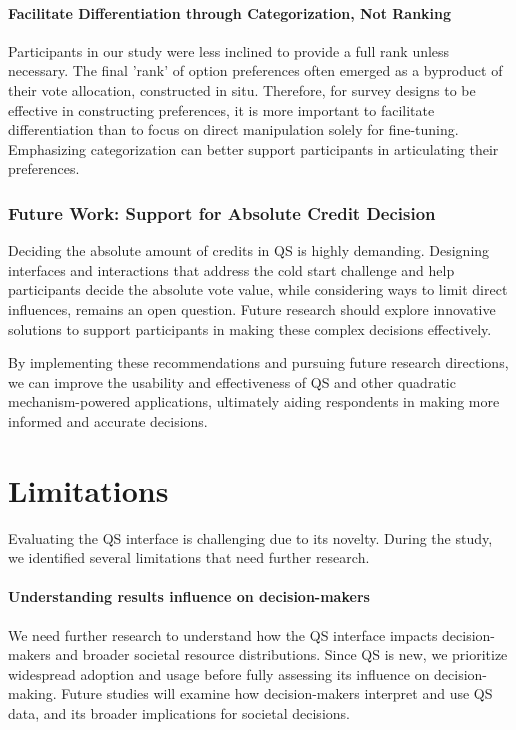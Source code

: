 \paragraph{Facilitate Differentiation through Categorization, Not Ranking}
Participants in our study were less inclined to provide a full rank unless necessary. The final 'rank' of option preferences often emerged as a byproduct of their vote allocation, constructed in situ. Therefore, for survey designs to be effective in constructing preferences, it is more important to facilitate differentiation than to focus on direct manipulation solely for fine-tuning. Emphasizing categorization can better support participants in articulating their preferences.

\subsubsection{Future Work: Support for Absolute Credit Decision}
Deciding the absolute amount of credits in QS is highly demanding. Designing interfaces and interactions that address the cold start challenge and help participants decide the absolute vote value, while considering ways to limit direct influences, remains an open question. Future research should explore innovative solutions to support participants in making these complex decisions effectively.

By implementing these recommendations and pursuing future research directions, we can improve the usability and effectiveness of QS and other quadratic mechanism-powered applications, ultimately aiding respondents in making more informed and accurate decisions.

\section{Limitations}
\label{sec:limitations}
Evaluating the QS interface is challenging due to its novelty. During the study, we identified several limitations that need further research.

\paragraph{Understanding results influence on decision-makers}
We need further research to understand how the QS interface impacts decision-makers and broader societal resource distributions. Since QS is new, we prioritize widespread adoption and usage before fully assessing its influence on decision-making. Future studies will examine how decision-makers interpret and use QS data, and its broader implications for societal decisions.


